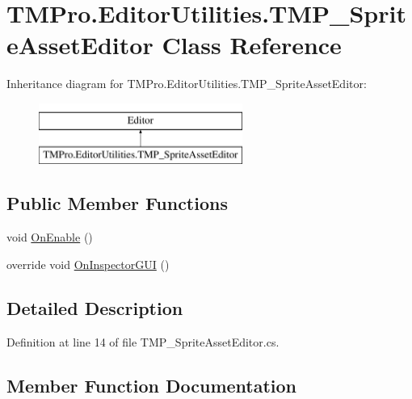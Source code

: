 \hypertarget{class_t_m_pro_1_1_editor_utilities_1_1_t_m_p___sprite_asset_editor}{}\section{T\+M\+Pro.\+Editor\+Utilities.\+T\+M\+P\+\_\+\+Sprite\+Asset\+Editor Class Reference}
\label{class_t_m_pro_1_1_editor_utilities_1_1_t_m_p___sprite_asset_editor}
Inheritance diagram for T\+M\+Pro.\+Editor\+Utilities.\+T\+M\+P\+\_\+\+Sprite\+Asset\+Editor\+:\begin{figure}[H]
\begin{center}
\leavevmode
\includegraphics[height=2.000000cm]{class_t_m_pro_1_1_editor_utilities_1_1_t_m_p___sprite_asset_editor}
\end{center}
\end{figure}
\subsection*{Public Member Functions}
\begin{DoxyCompactItemize}
\item 
void \mbox{\hyperlink{class_t_m_pro_1_1_editor_utilities_1_1_t_m_p___sprite_asset_editor_ae1b4511c2229bbfec1c7fb53102c51cf}{On\+Enable}} ()
\item 
override void \mbox{\hyperlink{class_t_m_pro_1_1_editor_utilities_1_1_t_m_p___sprite_asset_editor_a296eb60d2ec23a05512aa1ab4751e190}{On\+Inspector\+G\+UI}} ()
\end{DoxyCompactItemize}


\subsection{Detailed Description}


Definition at line 14 of file T\+M\+P\+\_\+\+Sprite\+Asset\+Editor.\+cs.



\subsection{Member Function Documentation}
\mbox{\label{class_t_m_pro_1_1_editor_utilities_1_1_t_m_p___sprite_asset_editor_ae1b4511c2229bbfec1c7fb53102c51cf}} 
